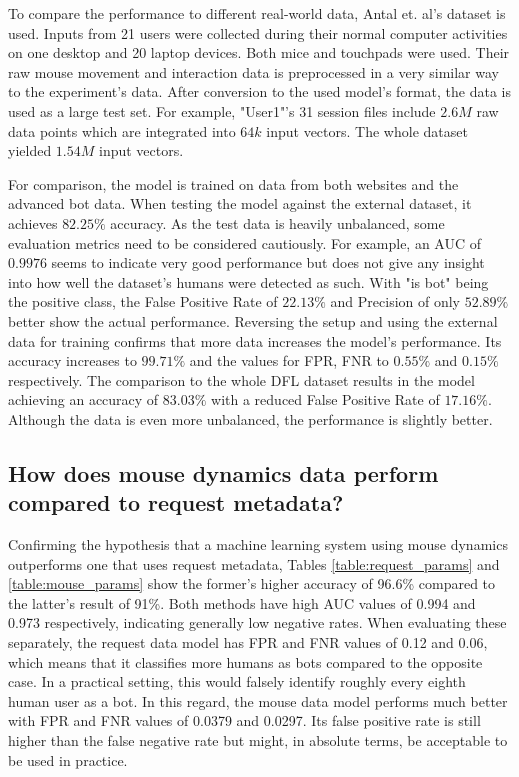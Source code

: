 \documentclass[
    fontsize=12pt,
    headings=small,
    parskip=half,           %
    bibliography=totoc,
    numbers=noenddot,       %
    open=any,               %
    final,                   %
    table
]{scrreprt}
\begin{document}
To compare the performance to different real-world data, Antal et. al's dataset \cite{9111596} is used. Inputs from 21 users were collected during their normal computer activities on one desktop and 20 laptop devices. Both mice and touchpads were used. Their raw mouse movement and interaction data is preprocessed in a very similar way to the experiment's data. After conversion to the used model's format, the data is used as a large test set. For example, "User1"'s 31 session files include $2.6M$ raw data points which are integrated into $64k$ input vectors. The whole dataset yielded $1.54M$ input vectors.

For comparison, the model is trained on data from both websites and the advanced bot data. When testing the model against the external dataset, it achieves $82.25\%$ accuracy. As the test data is heavily unbalanced, some evaluation metrics need to be considered cautiously. For example, an AUC of $0.9976$ seems to indicate very good performance but does not give any insight into how well the dataset's humans were detected as such. With "is bot" being the positive class, the False Positive Rate of $22.13\%$ and Precision of only $52.89\%$ better show the actual performance. Reversing the setup and using the external data for training confirms that more data increases the model's performance. Its accuracy increases to $99.71\%$ and the values for FPR, FNR to $0.55\%$ and $0.15\%$ respectively. The comparison to the whole DFL dataset results in the model achieving an accuracy of $83.03\%$ with a reduced False Positive Rate of $17.16\%$. Although the data is even more unbalanced, the performance is slightly better.


\subsection{How does mouse dynamics data perform compared to request metadata?}

Confirming the hypothesis that a machine learning system using mouse dynamics outperforms one that uses request metadata, Tables \ref{table:request_params} and \ref{table:mouse_params} show the former's higher accuracy of 96.6\% compared to the latter's result of 91\%. Both methods have high AUC values of 0.994 and 0.973 respectively, indicating generally low negative rates. When evaluating these separately, the request data model has FPR and FNR values of 0.12 and 0.06, which means that it classifies more humans as bots compared to the opposite case. In a practical setting, this would falsely identify roughly every eighth human user as a bot. In this regard, the mouse data model performs much better with FPR and FNR values of 0.0379 and 0.0297. Its false positive rate is still higher than the false negative rate but might, in absolute terms, be acceptable to be used in practice.
\end{document}
